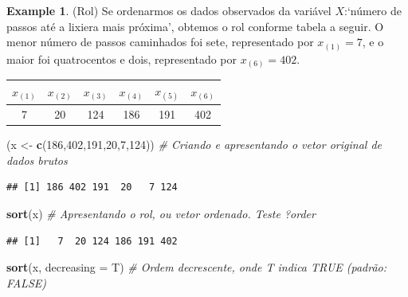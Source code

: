 \documentclass[
]{book}
\newenvironment{Shaded}{\begin{snugshade}}{\end{snugshade}}
\newcommand{\CommentTok}[1]{\textcolor[rgb]{0.56,0.35,0.01}{\textit{#1}}}
\newcommand{\DataTypeTok}[1]{\textcolor[rgb]{0.13,0.29,0.53}{#1}}
\newcommand{\DecValTok}[1]{\textcolor[rgb]{0.00,0.00,0.81}{#1}}
\newcommand{\KeywordTok}[1]{\textcolor[rgb]{0.13,0.29,0.53}{\textbf{#1}}}
\newcommand{\NormalTok}[1]{#1}
\newcommand{\StringTok}[1]{\textcolor[rgb]{0.31,0.60,0.02}{#1}}
\theoremstyle{definition}
\theoremstyle{definition}
\newtheorem{example}{Example}[chapter]
\theoremstyle{definition}
\theoremstyle{remark}
\begin{document}
\begin{example}
\protect\hypertarget{exm:rol1}{}{\label{exm:rol1} }(Rol) Se ordenarmos os dados observados da variável \(X\):`número de passos até a lixiera mais próxima', obtemos o rol conforme tabela a seguir. O menor número de passos caminhados foi sete, representado por \(x_{(1)}=7\), e o maior foi quatrocentos e dois, representado por \(x_{(6)}=402\).

\begin{longtable}[]{@{}cccccc@{}}
\toprule
\(x_{(1)}\) & \(x_{(2)}\) & \(x_{(3)}\) & \(x_{(4)}\) & \(x_{(5)}\) & \(x_{(6)}\)\tabularnewline
\midrule
\endhead
7 & 20 & 124 & 186 & 191 & 402\tabularnewline
\bottomrule
\end{longtable}
\end{example}

\begin{Shaded}
\begin{Highlighting}[]
\NormalTok{(x \textless{}{-}}\StringTok{ }\KeywordTok{c}\NormalTok{(}\DecValTok{186}\NormalTok{,}\DecValTok{402}\NormalTok{,}\DecValTok{191}\NormalTok{,}\DecValTok{20}\NormalTok{,}\DecValTok{7}\NormalTok{,}\DecValTok{124}\NormalTok{))  }\CommentTok{\# Criando e apresentando o vetor original de dados brutos}
\end{Highlighting}
\end{Shaded}

\begin{verbatim}
## [1] 186 402 191  20   7 124
\end{verbatim}

\begin{Shaded}
\begin{Highlighting}[]
\KeywordTok{sort}\NormalTok{(x)                         }\CommentTok{\# Apresentando o rol, ou vetor ordenado. Teste ?order}
\end{Highlighting}
\end{Shaded}

\begin{verbatim}
## [1]   7  20 124 186 191 402
\end{verbatim}

\begin{Shaded}
\begin{Highlighting}[]
\KeywordTok{sort}\NormalTok{(x, }\DataTypeTok{decreasing =}\NormalTok{ T)         }\CommentTok{\# Ordem decrescente, onde T indica TRUE (padrão: FALSE)}
\end{Highlighting}
\end{Shaded}
\end{document}
